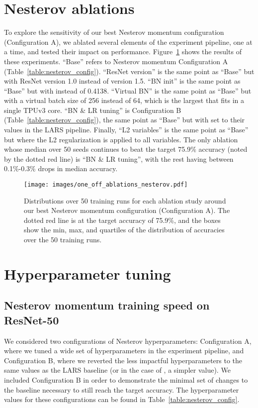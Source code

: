\documentclass{article}
\begin{document}
\section{Nesterov ablations}\label{appendix:nesterov-ablations}
To explore the sensitivity of our best Nesterov momentum configuration (Configuration A), we ablated several elements of the experiment pipeline, one at a time, and tested their impact on performance. Figure~\ref{fig:one_off_ablations_nesterov} shows the results of these experiments. ``Base'' refers to Nesterov momentum Configuration A (Table~\ref{table:nesterov_config}). ``ResNet version'' is the same point as ``Base'' but with ResNet version 1.0 instead of version 1.5. ``BN init'' is the same point as ``Base'' but with  instead of 0.4138. ``Virtual BN'' is the same point as ``Base'' but with a virtual batch size of 256 instead of 64, which is the largest that fits in a single TPUv3 core. ``BN \& LR tuning'' is Configuration B (Table~\ref{table:nesterov_config}), the same point as ``Base'' but with  set to their values in the LARS pipeline. Finally, ``L2 variables'' is the same point as ``Base'' but where the L2 regularization is applied to all variables.
The only ablation whose median over 50 seeds continues to beat the target 75.9\% accuracy (noted by the dotted red line) is ``BN \& LR tuning'', with the rest having between 0.1\%-0.3\% drops in median accuracy.
\begin{figure}[t]
    \centering
    \texttt{[image: images/one\_off\_ablations\_nesterov.pdf]}
    \caption{Distributions over 50 training runs for each ablation study around our best Nesterov momentum configuration (Configuration A). The dotted red line is at the target accuracy of 75.9\%, and the boxes show the min, max, and quartiles of the distribution of accuracies over the 50 training runs.}
    \label{fig:one_off_ablations_nesterov}
\end{figure}

\section{Hyperparameter tuning}

\subsection{Nesterov momentum training speed on ResNet-50}
\label{appendix:nesterov_config}

We considered two configurations of Nesterov hyperparameters: Configuration A, where we tuned a wide set of hyperparameters in the experiment pipeline, and Configuration B, where we reverted the less impactful hyperparameters to the same values as the LARS baseline (or in the case of , a simpler value). We included Configuration B in order to demonstrate the minimal set of changes to the baseline necessary to still reach the target accuracy. The hyperparameter values for these configurations can be found in Table~\ref{table:nesterov_config}. 
\end{document}
